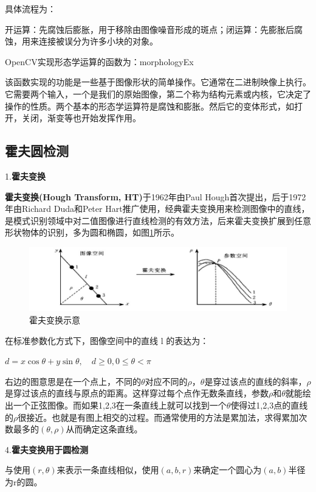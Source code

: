 具体流程为：

开运算：先腐蚀后膨胀，用于移除由图像噪音形成的斑点；闭运算：先膨胀后腐蚀，用来连接被误分为许多小块的对象。

OpenCV实现形态学运算的函数为：morphologyEx

该函数实现的功能是一些基于图像形状的简单操作。它通常在二进制映像上执行。它需要两个输入，一个是我们的原始图像，第二个称为结构元素或内核，它决定了操作的性质。两个基本的形态学运算符是腐蚀和膨胀。然后它的变体形式，如打开，关闭，渐变等也开始发挥作用。

\subsection{霍夫圆检测}

1.\textbf{霍夫变换}

\textbf{霍夫变换(Hough Transform, HT)}于1962年由Paul Hough首次提出，后于1972年由Richard Duda和Peter Hart推⼴使⽤，经典霍夫变换⽤来检测图像中的直线，是模式识别领域中对二值图像进行直线检测的有效方法\cite{Art2}，后来霍夫变换扩展到任意形状物体的识别，多为圆和椭圆，如图\ref{Fig:img1}所示。

\begin{figure}[ht]
  \centering
  \includegraphics[width=0.8\linewidth]{./Figure/Hough_Transform.png}
  \caption{霍夫变换示意}\label{Fig:img1}
\end{figure}

在标准参数化方式下，图像空间中的直线 l 的表达为：

$d=x \cos \theta+y \sin \theta, \quad d \geqslant 0,0 \leqslant \theta<\pi$

右边的图意思是在一个点上，不同的$\theta$对应不同的$\rho$，$\theta$是穿过该点的直线的斜率，$\rho$是穿过该点的直线与原点的距离。这样穿过每个点作无数条直线，参数$\rho$和$\theta$就能绘出一个正弦图像。而如果1,2,3在一条直线上就可以找到⼀个$\theta$使得过1,2,3点的直线的$\rho$很接近。也就是有图上相交的过程。而通常使用的方法是累加法，求得累加次数最多的$(\theta, \rho)$从而确定这条直线。

4.\textbf{霍夫变换用于圆检测}

与使用$(r, \theta)$来表示一条直线相似，使用$(a, b, r)$来确定一个圆心为$(a, b)$半径为r的圆。


